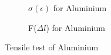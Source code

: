 \documentclass{scrartcl}
\begin{document}
\begin{figure}[!ht]
    \begin{subfigure}{0.49\textwidth}
        \centering
        \caption{$\sigma ( \epsilon)$ for Aluminium}
        \label{fig:alu_sigma}
    \end{subfigure}
    \begin{subfigure}{0.49\textwidth}
        \caption{F($\Delta l$) for Aluminium}
        \label{fig:alu_Force}
    \end{subfigure}
    \caption{Tensile test of Aluminium}
    \label{fig:tensileAlu}
\end{figure}
\end{document}
